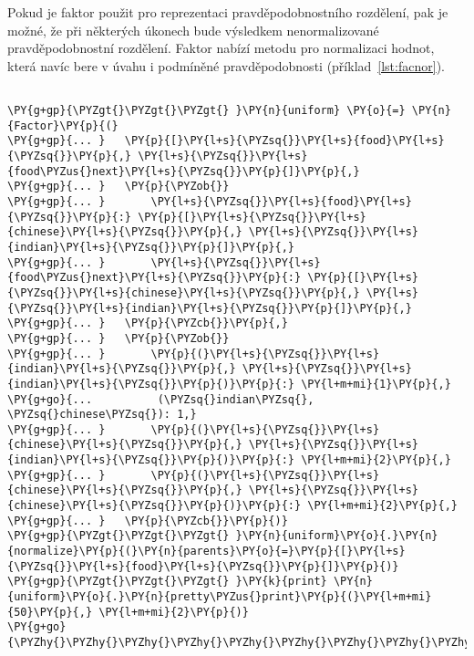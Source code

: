 Pokud je faktor použit pro reprezentaci pravděpodobnostního rozdělení, pak je možné, že při některých úkonech bude výsledkem nenormalizované pravděpodobnostní rozdělení.
Faktor nabízí metodu pro normalizaci hodnot, která navíc bere v úvahu i podmíněné pravděpodobnosti (příklad~\ref{lst:facnor}).

\begin{example}
\begin{Verbatim}[commandchars=\\\{\}]

\PY{g+gp}{\PYZgt{}\PYZgt{}\PYZgt{} }\PY{n}{uniform} \PY{o}{=} \PY{n}{Factor}\PY{p}{(}
\PY{g+gp}{... }   \PY{p}{[}\PY{l+s}{\PYZsq{}}\PY{l+s}{food}\PY{l+s}{\PYZsq{}}\PY{p}{,} \PY{l+s}{\PYZsq{}}\PY{l+s}{food\PYZus{}next}\PY{l+s}{\PYZsq{}}\PY{p}{]}\PY{p}{,}
\PY{g+gp}{... }   \PY{p}{\PYZob{}}
\PY{g+gp}{... }       \PY{l+s}{\PYZsq{}}\PY{l+s}{food}\PY{l+s}{\PYZsq{}}\PY{p}{:} \PY{p}{[}\PY{l+s}{\PYZsq{}}\PY{l+s}{chinese}\PY{l+s}{\PYZsq{}}\PY{p}{,} \PY{l+s}{\PYZsq{}}\PY{l+s}{indian}\PY{l+s}{\PYZsq{}}\PY{p}{]}\PY{p}{,}
\PY{g+gp}{... }       \PY{l+s}{\PYZsq{}}\PY{l+s}{food\PYZus{}next}\PY{l+s}{\PYZsq{}}\PY{p}{:} \PY{p}{[}\PY{l+s}{\PYZsq{}}\PY{l+s}{chinese}\PY{l+s}{\PYZsq{}}\PY{p}{,} \PY{l+s}{\PYZsq{}}\PY{l+s}{indian}\PY{l+s}{\PYZsq{}}\PY{p}{]}\PY{p}{,}
\PY{g+gp}{... }   \PY{p}{\PYZcb{}}\PY{p}{,}
\PY{g+gp}{... }   \PY{p}{\PYZob{}}
\PY{g+gp}{... }       \PY{p}{(}\PY{l+s}{\PYZsq{}}\PY{l+s}{indian}\PY{l+s}{\PYZsq{}}\PY{p}{,} \PY{l+s}{\PYZsq{}}\PY{l+s}{indian}\PY{l+s}{\PYZsq{}}\PY{p}{)}\PY{p}{:} \PY{l+m+mi}{1}\PY{p}{,}
\PY{g+go}{...	       (\PYZsq{}indian\PYZsq{}, \PYZsq{}chinese\PYZsq{}): 1,}
\PY{g+gp}{... }       \PY{p}{(}\PY{l+s}{\PYZsq{}}\PY{l+s}{chinese}\PY{l+s}{\PYZsq{}}\PY{p}{,} \PY{l+s}{\PYZsq{}}\PY{l+s}{indian}\PY{l+s}{\PYZsq{}}\PY{p}{)}\PY{p}{:} \PY{l+m+mi}{2}\PY{p}{,}
\PY{g+gp}{... }       \PY{p}{(}\PY{l+s}{\PYZsq{}}\PY{l+s}{chinese}\PY{l+s}{\PYZsq{}}\PY{p}{,} \PY{l+s}{\PYZsq{}}\PY{l+s}{chinese}\PY{l+s}{\PYZsq{}}\PY{p}{)}\PY{p}{:} \PY{l+m+mi}{2}\PY{p}{,}
\PY{g+gp}{... }   \PY{p}{\PYZcb{}}\PY{p}{)}
\PY{g+gp}{\PYZgt{}\PYZgt{}\PYZgt{} }\PY{n}{uniform}\PY{o}{.}\PY{n}{normalize}\PY{p}{(}\PY{n}{parents}\PY{o}{=}\PY{p}{[}\PY{l+s}{\PYZsq{}}\PY{l+s}{food}\PY{l+s}{\PYZsq{}}\PY{p}{]}\PY{p}{)}
\PY{g+gp}{\PYZgt{}\PYZgt{}\PYZgt{} }\PY{k}{print} \PY{n}{uniform}\PY{o}{.}\PY{n}{pretty\PYZus{}print}\PY{p}{(}\PY{l+m+mi}{50}\PY{p}{,} \PY{l+m+mi}{2}\PY{p}{)}
\PY{g+go}{\PYZhy{}\PYZhy{}\PYZhy{}\PYZhy{}\PYZhy{}\PYZhy{}\PYZhy{}\PYZhy{}\PYZhy{}\PYZhy{}\PYZhy{}\PYZhy{}\PYZhy{}\PYZhy{}\PYZhy{}\PYZhy{}\PYZhy{}\PYZhy{}\PYZhy{}\PYZhy{}\PYZhy{}\PYZhy{}\PYZhy{}\PYZhy{}\PYZhy{}\PYZhy{}\PYZhy{}\PYZhy{}\PYZhy{}\PYZhy{}\PYZhy{}\PYZhy{}\PYZhy{}\PYZhy{}\PYZhy{}\PYZhy{}\PYZhy{}\PYZhy{}\PYZhy{}\PYZhy{}\PYZhy{}\PYZhy{}\PYZhy{}\PYZhy{}\PYZhy{}\PYZhy{}\PYZhy{}\PYZhy{}\PYZhy{}\PYZhy{}}

\end{Verbatim}
\end{example}
